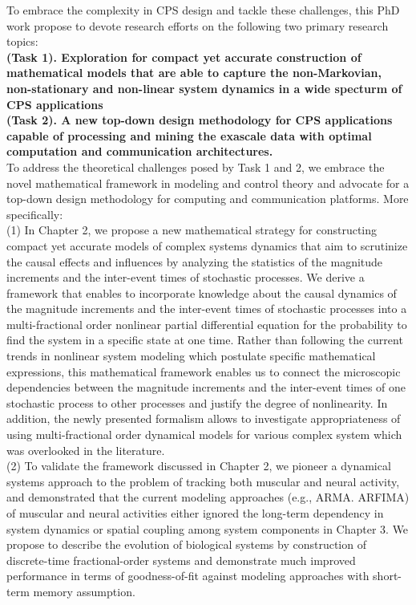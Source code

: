 To embrace the complexity in CPS design and tackle these challenges, this PhD work propose to devote research efforts on the following two primary research topics:\\
\noindent \textbf{(Task 1). Exploration for compact yet accurate construction of mathematical models that are able to capture the non-Markovian, non-stationary and non-linear system dynamics in a wide specturm of CPS applications}\\
\textbf{(Task 2). A new top-down design methodology for CPS applications capable of processing and mining the exascale data with optimal computation and communication architectures.}\\
To address the theoretical challenges posed by Task 1 and 2, we embrace the novel mathematical framework in modeling and control theory and advocate for a top-down design methodology for computing and communication platforms. More specifically: \\
(1) In Chapter 2, we propose a new mathematical strategy for constructing compact yet accurate models of complex systems dynamics that aim to scrutinize the causal effects and influences by analyzing the statistics of the magnitude increments and the inter-event times of stochastic processes. We derive a framework that enables to incorporate knowledge about the causal dynamics of the magnitude increments and the inter-event times of stochastic processes into a multi-fractional order nonlinear partial differential equation for the probability to find the system in a specific state at one time. Rather than following the current trends in nonlinear system modeling which postulate specific mathematical expressions, this mathematical framework enables us to connect the microscopic dependencies between the magnitude increments and the inter-event times of one stochastic process to other processes and justify the degree of nonlinearity. In addition, the newly presented formalism allows to investigate appropriateness of using multi-fractional order dynamical models for various complex system which was overlooked in the literature.\\
(2) To validate the framework discussed in Chapter 2, we pioneer a dynamical systems approach to the problem of tracking both muscular and neural activity, and demonstrated that the current modeling approaches (e.g., ARMA. ARFIMA) of muscular and neural activities either ignored the long-term dependency in system dynamics or spatial coupling among system components in Chapter 3. We propose to describe the evolution of biological systems by construction of discrete-time fractional-order systems and demonstrate much improved performance in terms of goodness-of-fit against modeling approaches with short-term memory assumption.\\ 
